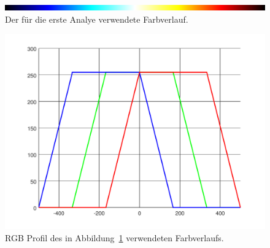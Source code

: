 \begin{figure}
	\centering
	\includegraphics[width=\linewidth]{cmb/converter/converter-function-strip.png}
	\caption{Der für die erste Analye verwendete Farbverlauf.}
	\label{fig:color-strip}
\end{figure}

\begin{figure}
	\centering
	\includegraphics[width=\linewidth]{cmb/converter/converter-function.pdf}
	\caption{RGB Profil des in Abbildung~\ref{fig:color-strip} 
		verwendeten Farbverlaufs.}
	\label{fig:color-strip-rgb}
\end{figure}
